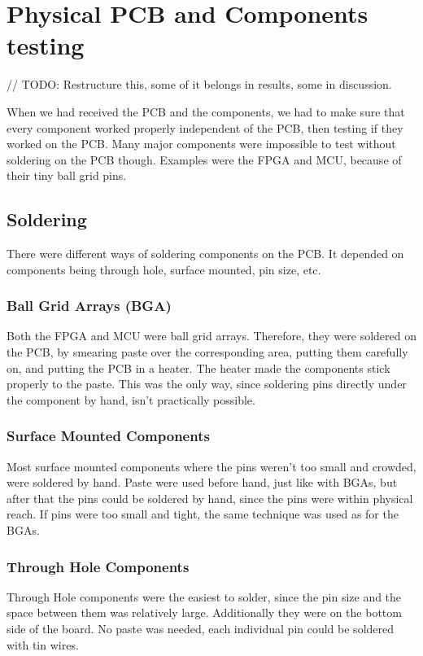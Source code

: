 \section{Physical PCB and Components testing}

// TODO: Restructure this, some of it belongs in results, some in discussion.

When we had received the PCB and the components, we had to make sure that every component worked properly independent of the PCB, then testing if they worked on the PCB. Many major components were impossible to test without soldering on the PCB though. Examples were the FPGA and MCU, because of their tiny ball grid pins.

\subsection{Soldering}
There were different ways of soldering components on the PCB. It depended on components being through hole, surface mounted, pin size, etc.
\subsubsection{Ball Grid Arrays (BGA)}
Both the FPGA and MCU were ball grid arrays.
Therefore, they were soldered on the PCB, by smearing paste over the corresponding area, putting them carefully on, and putting the PCB in a heater. The heater made the components stick properly to the paste. This was the only way, since soldering pins directly under the component by hand, isn't practically possible.

\subsubsection{Surface Mounted Components}
Most surface mounted components where the pins weren't too small and crowded, were soldered by hand. Paste were used before hand, just like with BGAs, but after that the pins could be soldered by hand, since the pins were within physical reach. 
\newline
If pins were too small and tight, the same technique was used as for the BGAs.

\subsubsection{Through Hole Components}
Through Hole components were the easiest to solder, since the pin size and the space between them was relatively large. Additionally they were on the bottom side of the board. No paste was needed, each individual pin could be soldered with tin wires.

